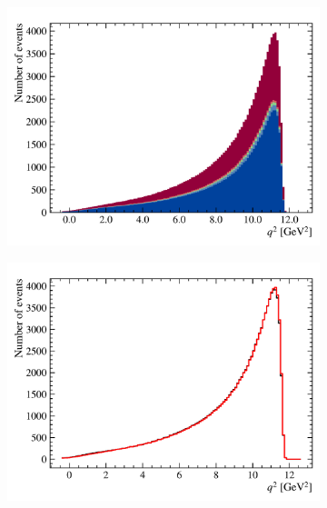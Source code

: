 \begin{figure}[!htb]
\begin{subfigure}[b]{0.32\textwidth}
        \centering
        \includegraphics[width=\textwidth]{figs-fit-fit-templates/data-driven-plots/misid/D0_q2_smr.pdf}
    \end{subfigure}
    \hfill
    \begin{subfigure}[b]{0.32\textwidth}
        \centering
        \includegraphics[width=\textwidth]{figs-fit-fit-templates/data-driven-plots/misid/D0_q2_comp.pdf}
    \end{subfigure}
    \\
    \begin{subfigure}[b]{0.32\textwidth}
        \centering

\end{subfigure}
\end{figure}
